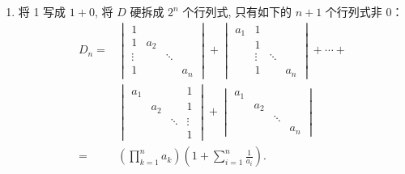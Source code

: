 \documentclass[12pt,fontset=fandol]{ctexart}
\begin{document}
\begin{solve}
\begin{enumerate}
                \item 将 1 写成 $1+0$, 将 $D$ 硬拆成 $2^{n}$ 个行列式, 只有如下的 $n+1$ 个行列式非 0：
                      \begin{align*}
                          D_n = & \begin{vmatrix}
                                      1      &       &        &       \\
                                      1      & a_{2} &        &       \\
                                      \vdots &       & \ddots &       \\
                                      1      &       &        & a_{n}
                                  \end{vmatrix}
                          +\begin{vmatrix}
                               a_{1} & 1      &                \\
                                     & 1      &                \\
                                     & \vdots & \ddots &       \\
                                     & 1      &        & a_{n}
                           \end{vmatrix}+\cdots+                    \\
                                & \begin{vmatrix}
                                      a_{1} &       &        & 1      \\
                                            & a_{2} &        & 1      \\
                                            &       & \ddots & \vdots \\
                                            &       &        & 1
                                  \end{vmatrix}
                          +\begin{vmatrix}
                               a_{1} &                      \\
                                     & a_{2} &              \\
                                     &       & \ddots &     \\
                                     &       &        & a_n
                           \end{vmatrix}                       \\
                          =     & \left(\prod_{k=1}^na_k\right)
                          \left(1+\sum_{i=1}^n\frac{1}{a_i}\right).
                      \end{align*}
            \end{enumerate}
\end{solve}
\end{document}
